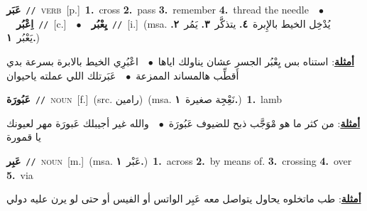 \documentclass[10pt,a4paper,twoside]{article} %
\begin{document}
\begin{multicols}{2}
{\setlength\topsep{0pt}\textbf{\foreignlanguage{arabic}{عَبَر}}\ {\color{gray}\texttt{//}\color{black}}\ \textsc{verb}\ [p.]\ \textbf{1.}~cross  \textbf{2.}~pass  \textbf{3.}~remember  \textbf{4.}~thread the needle\ \ $\bullet$\ \ \setlength\topsep{0pt}\textbf{\foreignlanguage{arabic}{اِعْبُر}}\ {\color{gray}\texttt{//}\color{black}}\ [c.]\ \ $\bullet$\ \ \setlength\topsep{0pt}\textbf{\foreignlanguage{arabic}{يِعْبُر}}\ {\color{gray}\texttt{//}\color{black}}\ [i.]\ \color{gray}(msa. \foreignlanguage{arabic}{يُدْخِل الخيط بالإِبرة}~\foreignlanguage{arabic}{\textbf{٤.}}  \foreignlanguage{arabic}{يتذكَّر}~\foreignlanguage{arabic}{\textbf{٣.}}  \foreignlanguage{arabic}{يَمُر}~\foreignlanguage{arabic}{\textbf{٢.}}  \foreignlanguage{arabic}{يَعْبُر}~\foreignlanguage{arabic}{\textbf{١.}})\color{black}\  \begin{flushright}\color{gray}\foreignlanguage{arabic}{\textbf{\underline{\foreignlanguage{arabic}{أمثلة}}}: استناه بس يِعْبُر الجسر عشان يناولك اياها\ $\bullet$\ \  اعْبُرِي الخيط بالابرة بسرعة بدي أَقطِّب هالمساند الممزعة\ $\bullet$\ \  عَبَرتلك اللي عملته ياحيوان}\end{flushright}\color{black}} \vspace{2mm}

{\setlength\topsep{0pt}\textbf{\foreignlanguage{arabic}{عَبُورَة}}\ {\color{gray}\texttt{//}\color{black}}\ \textsc{noun}\ [f.]\ (src. \color{gray}\foreignlanguage{arabic}{رامين}\color{black})\ \color{gray}(msa. \foreignlanguage{arabic}{نَعِْجِة صغيرة}~\foreignlanguage{arabic}{\textbf{١.}})\color{black}\ \textbf{1.}~lamb\  \begin{flushright}\color{gray}\foreignlanguage{arabic}{\textbf{\underline{\foreignlanguage{arabic}{أمثلة}}}: من كثر ما هو مْوَجَّب ذبح للضيوف عَبُورَة\ $\bullet$\ \  والله غير أجيبلك عَبورَة مهر لعيونك يا قمورة}\end{flushright}\color{black}} \vspace{2mm}

{\setlength\topsep{0pt}\textbf{\foreignlanguage{arabic}{عَبِر}}\ {\color{gray}\texttt{//}\color{black}}\ \textsc{noun}\ [m.]\ \color{gray}(msa. \foreignlanguage{arabic}{عَبْر}~\foreignlanguage{arabic}{\textbf{١.}})\color{black}\ \textbf{1.}~across  \textbf{2.}~by means of.  \textbf{3.}~crossing  \textbf{4.}~over  \textbf{5.}~via\  \begin{flushright}\color{gray}\foreignlanguage{arabic}{\textbf{\underline{\foreignlanguage{arabic}{أمثلة}}}: طب ماتخلوه يحاول يتواصل معه عَبِر الواتس أو الفيس أو حتى لو يرن عليه دولي}\end{flushright}\color{black}} \vspace{2mm}


\end{multicols}
\end{document}
